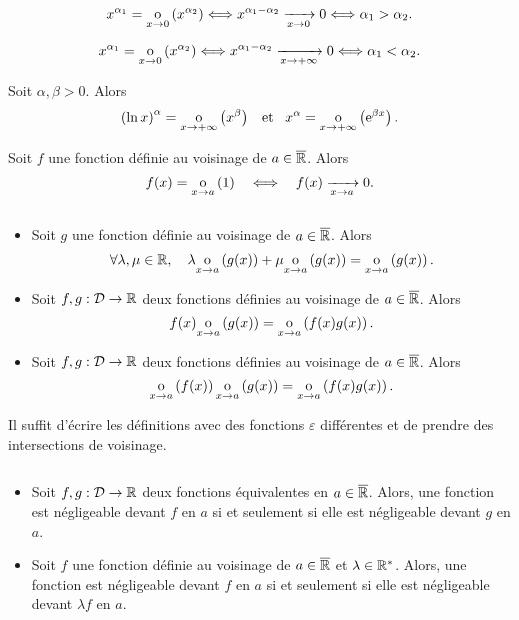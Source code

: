 \documentclass{magnoliaold}
\begin{document}
\begin{preuve}
$$x^{\alpha_1}=\underset{x \rightarrow 0}{\text{o}}\left(x^{\alpha_2}\right)\Longleftrightarrow x^{\alpha_1-\alpha_2}\xrightarrow[x\rightarrow 0]{}0 \Longleftrightarrow \alpha_1 > \alpha_2.$$

$$x^{\alpha_1}=\underset{x \rightarrow 0}{\text{o}}\left(x^{\alpha_2}\right)\Longleftrightarrow x^{\alpha_1-\alpha_2}\xrightarrow[x\rightarrow +\infty]{}0 \Longleftrightarrow \alpha_1 <\alpha_2.$$
\end{preuve}

\begin{proposition}[utile=-3]
Soit $\alpha,\beta>0$. Alors
\[\left(\ln x\right)^\alpha=\underset{x \rightarrow +\infty}{\text{o}}\left(x^\beta\right) \quad\!\text{et}\quad\! x^\alpha=\underset{x \rightarrow +\infty}{\text{o}}\left({\rm e}^{\beta x}\right).\]
\end{proposition}

\begin{proposition}[utile=-3]
Soit $f$ une fonction définie au voisinage de $a\in\overline{\mathbb{R}}$. Alors
\[f(x)=\underset{x \rightarrow a}{\text{o}}\left(1\right) \quad\Longleftrightarrow\quad f(x)\xrightarrow[x\rightarrow a]{}0.\]
\end{proposition}

\begin{proposition}[utile=-3]
$\quad$
\begin{itemize}
\item Soit $g$ une fonction définie au voisinage de $a\in\overline{\mathbb{R}}$. Alors
  \[\forall \lambda,\mu\in\mathbb{R} ,\quad \lambda\underset{x \rightarrow a}{\text{o}}\left(g(x)\right)+
    \mu\underset{x \rightarrow a}{\text{o}}\left(g(x)\right)=\underset{x \rightarrow a}{\text{o}}\left(g(x)\right).\]
\item Soit $f,g:\mathcal{D}\to\mathbb{R}$ deux fonctions définies au voisinage de $a\in\overline{\mathbb{R}}$. Alors
  \[f(x)\underset{x \rightarrow a}{\text{o}}\left(g(x)\right)=\underset{x \rightarrow a}{\text{o}}\left(f(x)g(x)\right).\]
\item Soit $f,g:\mathcal{D}\to\mathbb{R}$ deux fonctions définies au voisinage de $a\in\overline{\mathbb{R}}$. Alors
  \[\underset{x \rightarrow a}{\text{o}}\left(f(x)\right)\underset{x \rightarrow a}{\text{o}}\left(g(x)\right)=
    \underset{x \rightarrow a}{\text{o}}\left(f(x)g(x)\right).\]
\end{itemize}
\end{proposition}

\begin{preuve}
Il suffit d'écrire les définitions avec des fonctions $\varepsilon$ différentes et de prendre des intersections de voisinage.
\end{preuve}

\begin{proposition}[utile=-3]
$\quad$
\begin{itemize}
\item Soit $f,g:\mathcal{D}\to\mathbb{R}$ deux fonctions équivalentes en $a\in\overline{\mathbb{R}}$. Alors, une
  fonction est négligeable devant $f$ en $a$ si et seulement si elle est
  négligeable devant $g$ en $a$.
\item Soit $f$ une fonction définie au voisinage de $a\in\overline{\mathbb{R}}$ et $\lambda\in{\mathbb{R}^*}$.
  Alors, une fonction est négligeable devant $f$ en $a$ si et seulement si
  elle est négligeable devant $\lambda f$ en $a$.
\end{itemize}
\end{proposition}
\end{document}
